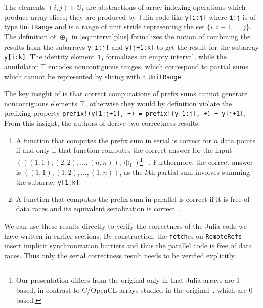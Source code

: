 \documentclass{sig-alternate}
\newcommand{\code}[1]{\texttt{#1}}
\begin{document}
The elements $(i, j) \in \mathbb S_I$ are abstractions of array indexing
operations which produce array slices; they are produced by Julia code like
\code{y[i:j]} where \code{i:j} is of type \code{UnitRange} and is a range of
unit stride representing the set $\{i, i+1, \dots, j\}$. The definition of
$\oplus_I$ in \eqref{eq:intervalplus} formalizes the notion of combining the
results from the subarrays \code{y[i:j]} and \code{y[j+1:k]} to get the result
for the subarray \code{y[i:k]}.  The identity element $\mathbf 1_I$ formalizes
an empty interval, while the annihilator $\top$ encodes noncontiguous ranges,
which correspond to partial sums which cannot be represented by slicing with a
\code{UnitRange}.

The key insight of \cite{Chong2014} is that correct computations of prefix sums
cannot generate noncontiguous elements $\top$, otherwise they would by
definition violate the prefixing property \code{prefix!(y[1:j+1], +) =
prefix!(y[1:j], +) + y[j+1]}.\\
From this insight, the authors of \cite{Chong2014} derive two correctness
results:

\begin{enumerate}
		
\item 	A function that computes the prefix sum in serial is correct for $n$
	data points if and only if that function computes the correct answer
	for the input \\
	$\left(\left((1, 1), (2, 2), \dots, (n, n)\right),
	\oplus_I\right)$\footnote{Our presentation differs from the original
	only in that Julia arrays are 1-based, in contrast to C/OpenCL arrays
	studied in the original~\cite{Chong2014}, which are 0-based.}
	~\cite[Theorem 4.5]{Chong2014}.
	Furthermore, the correct answer is $\left((1, 1), (1, 2), \dots, (1, n)
	\right)$, as the $k$th partial sum involves summing the subarray
	\code{y[1:k]}.
	
\item	A function that computes the prefix sum in parallel is correct if it is
	free of data races and its equivalent serialization is
	correct~\cite[Theorem 5.3]{Chong2014}.

\end{enumerate}

We can use these results directly to verify the correctness of the Julia code
we have written in earlier sections. By construction, the \code{fetch}es on
\code{RemoteRefs} insert implicit synchronization barriers and thus the
parallel code is free of data races. Thus only the serial correctness result
needs to be verified explicitly.
\end{document}
